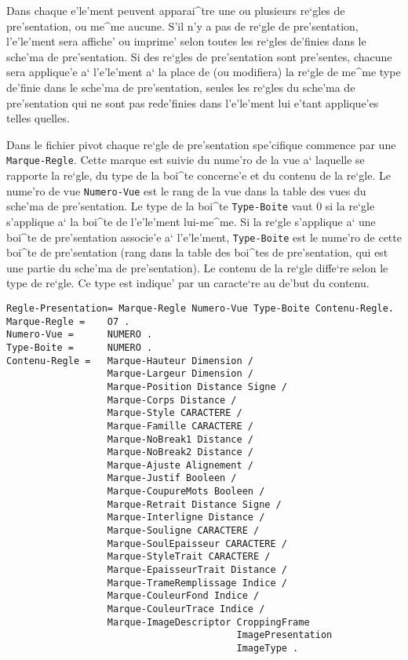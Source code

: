 Dans chaque e'le'ment peuvent apparai^tre une ou plusieurs re`gles de
pre'sentation, ou me^me aucune. S'il n'y a pas de re`gle de pre'sentation,
l'e'le'ment sera affiche' ou imprime' selon toutes les re`gles de'finies dans le
sche'ma de pre'sentation. Si des re`gles de pre'sentation sont pre'sentes, chacune
sera applique'e a` l'e'le'ment a` la place de (ou modifiera) la re`gle de me^me
type de'finie dans le sche'ma de pre'sentation, seules les re`gles du sche'ma de
pre'sentation qui ne sont pas rede'finies dans l'e'le'ment lui e'tant applique'es
telles quelles.

Dans le fichier pivot chaque re`gle de pre'sentation spe'cifique commence par une
{\tt Marque-Regle}. Cette marque est suivie du nume'ro de la vue a` laquelle
se rapporte la re`gle, du type de la boi^te concerne'e et du contenu de la
re`gle. Le nume'ro de vue {\tt Numero-Vue} est le rang de la vue dans la table
des vues du sche'ma de pre'sentation. Le type de la boi^te {\tt Type-Boite}
vaut 0 si la re`gle s'applique a` la boi^te de l'e'le'ment lui-me^me. Si la re`gle
s'applique a` une boi^te de pre'sentation associe'e a` l'e'le'ment, {\tt Type-Boite}
est le nume'ro de cette boi^te de pre'sentation (rang dans la table des boi^tes
de pre'sentation, qui est une partie du sche'ma de pre'sentation). Le contenu de
la re`gle diffe`re selon le type de re`gle. Ce type est indique' par un caracte`re
au de'but du contenu.

\begin{verbatim}
Regle-Presentation= Marque-Regle Numero-Vue Type-Boite Contenu-Regle.
Marque-Regle =    O7 .
Numero-Vue =      NUMERO .
Type-Boite =      NUMERO .
Contenu-Regle =   Marque-Hauteur Dimension /
                  Marque-Largeur Dimension /
                  Marque-Position Distance Signe /
                  Marque-Corps Distance /
                  Marque-Style CARACTERE /
                  Marque-Famille CARACTERE /
                  Marque-NoBreak1 Distance /
                  Marque-NoBreak2 Distance /
                  Marque-Ajuste Alignement /
                  Marque-Justif Booleen /
                  Marque-CoupureMots Booleen /
                  Marque-Retrait Distance Signe /
                  Marque-Interligne Distance /
                  Marque-Souligne CARACTERE /
                  Marque-SoulEpaisseur CARACTERE /
                  Marque-StyleTrait CARACTERE /
                  Marque-EpaisseurTrait	Distance /
                  Marque-TrameRemplissage Indice /
                  Marque-CouleurFond Indice /
                  Marque-CouleurTrace Indice /
                  Marque-ImageDescriptor CroppingFrame 
                                         ImagePresentation 
                                         ImageType .
\end{verbatim}                  

